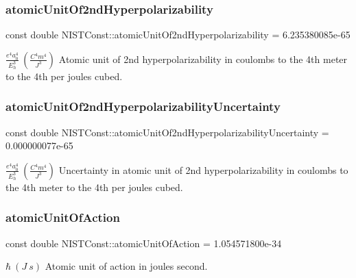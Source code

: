 \subsubsection{\texorpdfstring{atomic\+Unit\+Of2nd\+Hyperpolarizability}{atomicUnitOf2ndHyperpolarizability}}
{\footnotesize\ttfamily const double N\+I\+S\+T\+Const\+::atomic\+Unit\+Of2nd\+Hyperpolarizability = 6.\+235380085e-\/65}

$\frac{e^4 a_0^4}{E_h^3} \ (\frac{C^4 m^4}{J^3})$ Atomic unit of 2nd hyperpolarizability in coulombs to the 4th meter to the 4th per joules cubed. \mbox{\label{group___n_i_s_t_const-_atomic_unit_ga0977fcc84fb0f3d50f77493053fba633}} 
\subsubsection{\texorpdfstring{atomic\+Unit\+Of2nd\+Hyperpolarizability\+Uncertainty}{atomicUnitOf2ndHyperpolarizabilityUncertainty}}
{\footnotesize\ttfamily const double N\+I\+S\+T\+Const\+::atomic\+Unit\+Of2nd\+Hyperpolarizability\+Uncertainty = 0.\+000000077e-\/65}

$\frac{e^4 a_0^4}{E_h^3} \ (\frac{C^4 m^4}{J^3})$ Uncertainty in atomic unit of 2nd hyperpolarizability in coulombs to the 4th meter to the 4th per joules cubed. \mbox{\label{group___n_i_s_t_const-_atomic_unit_ga6685e215d87395646fc18e2efa30d7a0}} 
\subsubsection{\texorpdfstring{atomic\+Unit\+Of\+Action}{atomicUnitOfAction}}
{\footnotesize\ttfamily const double N\+I\+S\+T\+Const\+::atomic\+Unit\+Of\+Action = 1.\+054571800e-\/34}

$\hbar \ (J\ s)$ Atomic unit of action in joules second. \mbox{\label{group___n_i_s_t_const-_atomic_unit_ga23528f5eb51ef25537027bf44e12663c}} 
